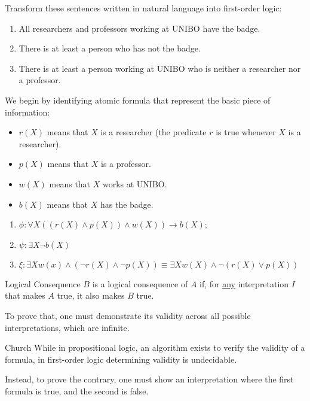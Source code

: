 \documentclass{article}
\begin{document}
\begin{exam}
    Transform these sentences written in natural language into first-order
    logic:
    \begin{enumerate}
        \item All researchers and professors working at UNIBO have the badge.
        \item There is at least a person who has not the badge.
        \item There is at least a person working at UNIBO who is neither a
            researcher nor a professor.
    \end{enumerate}  
    We begin by identifying atomic formula that represent the basic piece of
    information:
    \begin{itemize}
        \item $r(X)$ means that $X$ is a researcher (the predicate $r$ is true
        whenever $X$ is a researcher).
        \item $p(X)$ means that $X$ is a professor.
        \item $w(X)$ means that $X$ works at UNIBO.
        \item $b(X)$ means that $X$ has the badge.
    \end{itemize}
    \begin{enumerate}
       \item $\phi:\forall X((r(X)\land p(X)) \land w(X))\to b(X)$;
       \item $\psi:\exists X\neg b(X)$
       \item $\xi :\exists X w(x)\land(\neg r(X)\land \neg p(X))\equiv \exists X
       w(X)\land\neg(r(X)\lor p(X))$
    \end{enumerate}
\end{exam}
\begin{Definition}{Logical Consequence}{}
    $B$ is a logical consequence of $A$ if, for \underline{any} interpretation
    $I$ that makes $A$ true, it also makes $B$ true.
\end{Definition}
To prove that, one must demonstrate its validity across all possible
interpretations, which are infinite. 
\begin{Theorem}{Church}{}
    While in propositional logic, an algorithm exists to verify the validity
    of a formula, in first-order logic determining validity is undecidable.
\end{Theorem}
Instead, to prove the contrary, one must show an interpretation where the
first formula is true, and the second is false.
\end{document}

